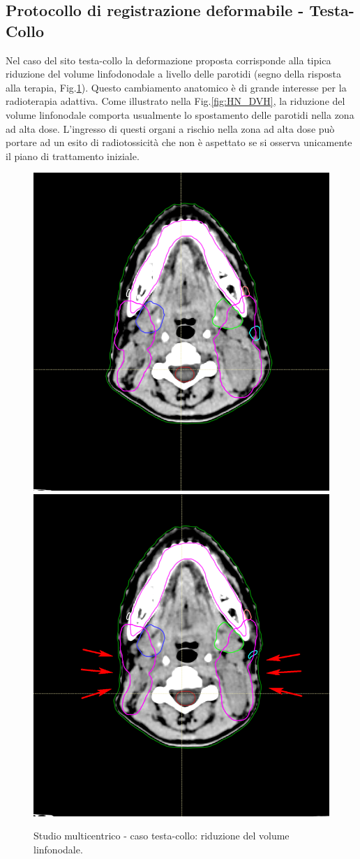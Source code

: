 \subsection{Protocollo di registrazione deformabile - Testa-Collo}
Nel caso del sito testa-collo la deformazione proposta corrisponde alla tipica riduzione del volume linfodonodale a livello delle parotidi (segno della risposta alla terapia, Fig.\ref{fig:YES_HN}). Questo cambiamento anatomico è di grande interesse per la radioterapia adattiva. Come illustrato nella Fig.\ref{fig:HN_DVH}, la riduzione del volume linfonodale comporta usualmente lo spostamento delle parotidi nella zona ad alta dose. L'ingresso di questi organi a rischio nella zona ad alta dose può portare ad un esito di radiotossicità che non è aspettato se si osserva unicamente il piano di trattamento iniziale.

\begin{figure}
\centering
\includegraphics[width=.48\textwidth]{./cap3/YES_HN.png}
\includegraphics[width=.48\textwidth]{./cap3/YES_HN_shrink.png}
\caption{Studio multicentrico - caso testa-collo: riduzione del volume linfonodale.}
\label{fig:YES_HN}
\end{figure}

